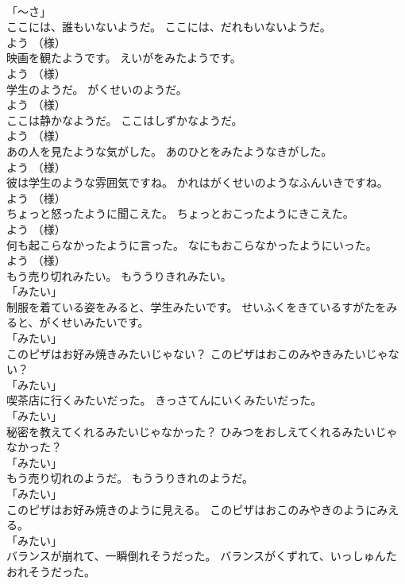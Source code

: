 \documentclass[8pt]{extreport}
\begin{document}
\begin{CJK}{UTF8}{min}
\\	「～さ」 
\\	ここには、誰もいないようだ。	ここには、だれもいないようだ。	
\\	よう （様）	
\\	映画を観たようです。	えいがをみたようです。	
\\	よう （様）	
\\	学生のようだ。	がくせいのようだ。	
\\	よう （様）	
\\	ここは静かなようだ。	ここはしずかなようだ。	
\\	よう （様）	
\\	あの人を見たような気がした。	あのひとをみたようなきがした。	
\\	よう （様）	
\\	彼は学生のような雰囲気ですね。	かれはがくせいのようなふんいきですね。	
\\	よう （様）	
\\	ちょっと怒ったように聞こえた。	ちょっとおこったようにきこえた。	
\\	よう （様）	
\\	何も起こらなかったように言った。	なにもおこらなかったようにいった。	
\\	よう （様）	
\\	もう売り切れみたい。	もううりきれみたい。	
\\	「みたい」 
\\	制服を着ている姿をみると、学生みたいです。	せいふくをきているすがたをみると、がくせいみたいです。	
\\	「みたい」 
\\	このピザはお好み焼きみたいじゃない？	このピザはおこのみやきみたいじゃない？	
\\	「みたい」 
\\	喫茶店に行くみたいだった。	きっさてんにいくみたいだった。	
\\	「みたい」 
\\	秘密を教えてくれるみたいじゃなかった？	ひみつをおしえてくれるみたいじゃなかった？	
\\	「みたい」 
\\	もう売り切れのようだ。	もううりきれのようだ。	
\\	「みたい」 
\\	このピザはお好み焼きのように見える。	このピザはおこのみやきのようにみえる。	
\\	「みたい」 
\\	バランスが崩れて、一瞬倒れそうだった。	バランスがくずれて、いっしゅんたおれそうだった。	

\end{CJK}
\end{document}
